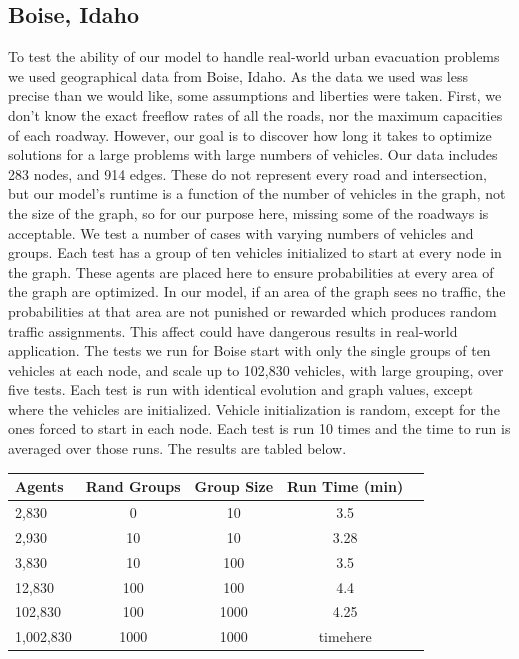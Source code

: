 \documentclass{sig-alternate-05-2015}
\begin{document}
		\subsection{Boise, Idaho}
			To test the ability of our model to handle real-world urban evacuation problems we used geographical data from Boise, Idaho. As the data we used was less precise than we would like, some assumptions and liberties were taken. First, we don't know the exact freeflow rates of all the roads, nor the maximum capacities of each roadway. However, our goal is to discover how long it takes to optimize solutions for a large problems with large numbers of vehicles. Our data includes 283 nodes, and 914 edges. These do not represent every road and intersection, but our model's runtime is a function of the number of vehicles in the graph, not the size of the graph, so for our purpose here, missing some of the roadways is acceptable. 
			We test a number of cases with varying numbers of vehicles and groups. Each test has a group of ten vehicles initialized to start at every node in the graph. These agents are placed here to ensure probabilities at every area of the graph are optimized. In our model, if an area of the graph sees no traffic, the probabilities at that area are not punished or rewarded which produces random traffic assignments. This affect could have dangerous results in real-world application.
			The tests we run for Boise start with only the single groups of ten vehicles at each node, and scale up to 102,830 vehicles, with large grouping, over five tests. Each test is run with identical evolution and graph values, except where the vehicles are initialized. Vehicle initialization is random, except for the ones forced to start in each node. Each test is run 10 times and the time to run is averaged over those runs. The results are tabled below.
			
			\begin{tabular}{l*{4}{c}}
				\hline \hline
				Agents & Rand Groups & Group Size & Run Time (min)  \\
				\hline
				2,830 & 0 & 10 & 3.5 \\
				2,930 & 10 & 10 &  3.28 \\
				3,830 & 10 & 100 & 3.5 \\
				12,830 & 100 & 100 & 4.4 \\
				102,830 & 100 & 1000 & 4.25 \\
				1,002,830 & 1000 & 1000 & timehere\\
				\hline
			\end{tabular}
		
\end{document}
